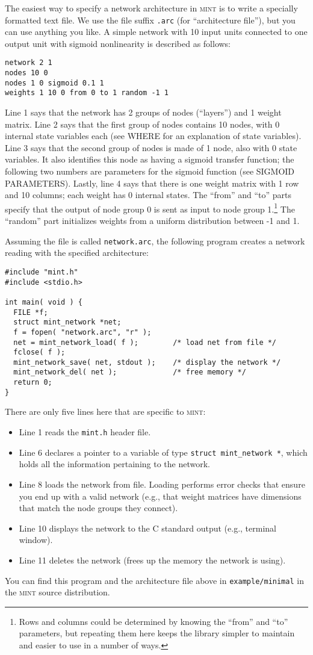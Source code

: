 \documentclass[11pt,letterpaper]{memoir}
\newcommand{\mint}{{\scshape\sffamily mint}\xspace}
\begin{document}
The easiest way to specify a network architecture in \mint is to write
a specially formatted text file. We use the file suffix
\lstinline{.arc} (for ``architecture file''), but you can use anything
you like.  A simple network with 10 input units connected to one
output unit with sigmoid nonlinearity is described as follows:
\begin{lstlisting}
network 2 1
nodes 10 0 
nodes 1 0 sigmoid 0.1 1
weights 1 10 0 from 0 to 1 random -1 1
\end{lstlisting}
Line 1 says that the network has 2 groups of nodes (``layers'') and 1
weight matrix. Line 2 says that the first group of nodes contains 10
nodes, with 0 internal state variables each (see WHERE for an
explanation of state variables). Line 3 says that the second group of
nodes is made of 1 node, also with 0 state variables. It also
identifies this node as having a sigmoid transfer function; the
following two numbers are parameters for the sigmoid function (see
SIGMOID PARAMETERS). Lastly, line 4 says that there is one weight
matrix with 1 row and 10 columns; each weight has 0 internal states.
The ``from'' and ``to'' parts specify that the output of node group 0
is sent as input to node group 1.\footnote{Rows and columns could be
  determined by knowing the ``from'' and ``to'' parameters, but
  repeating them here keeps the library simpler to maintain and easier
  to use in a number of ways.}  The ``random'' part initializes
weights from a uniform distribution between -1 and 1.

Assuming the file is called \lstinline{network.arc}, the following
program creates a network reading with the specified architecture:
\begin{lstlisting}
#include "mint.h"
#include <stdio.h>

int main( void ) {
  FILE *f; 
  struct mint_network *net;
  f = fopen( "network.arc", "r" );
  net = mint_network_load( f );        /* load net from file */
  fclose( f );
  mint_network_save( net, stdout );    /* display the network */
  mint_network_del( net );             /* free memory */
  return 0;
}
\end{lstlisting}
There are only five lines here that are specific to \mint:
\begin{itemize}
\item Line 1 reads the \lstinline{mint.h} header file.
\item Line 6 declares a pointer to a variable of type
  \lstinline{struct mint_network *}, which holds all the information
  pertaining to the network.
\item Line 8 loads the network from file. Loading performs error
  checks that ensure you end up with a valid network (e.g., that
  weight matrices have dimensions that match the node groups they
  connect).
\item Line 10 displays the network to the C standard output (e.g.,
  terminal window).
\item Line 11 deletes the network (frees up the memory the network is
  using).
\end{itemize}
You can find this program and the architecture file above in
\lstinline{example/minimal} in the \mint source distribution.
\end{document}
